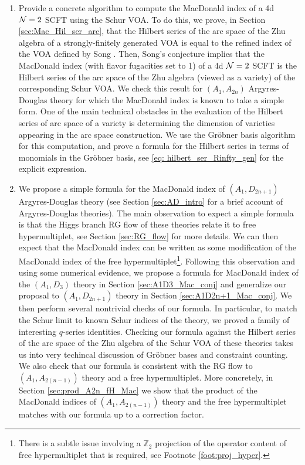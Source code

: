 \documentclass[a4paper,10pt]{article}
\newcommand{\Z}{\mathds{Z}}
\newcommand{\tsf}[1]{\textsf{#1}}
\def\CN {{\cal N}}
\begin{document}
\begin{enumerate}
    \item Provide a concrete algorithm to compute the MacDonald index of a 4d $\CN=2$ \tsf{SCFT} using the Schur \tsf{VOA}. To do this, we prove, in Section \ref{sec:Mac_Hil_ser_arc}, that the Hilbert series of the arc space of the Zhu algebra of a strongly-finitely generated \tsf{VOA} is equal to the refined index of the \tsf{VOA} defined by Song \cite{Song:2016yfd}. Then, Song's conjecture implies that the MacDonald index (with flavor fugacities set to 1) of a 4d $\CN=2$ \tsf{SCFT} is the Hilbert series of the arc space of the Zhu algebra (viewed as a variety) of the corresponding Schur \tsf{VOA}. We check this result for $(A_1,A_{2n})$ Argyres-Douglas theory for which the MacDonald index is known to take a simple form. One of the main technical obstacles in the evaluation of the Hilbert series of arc space of a variety is determining the dimension of varieties appearing in the arc space construction. We use the Gr\"{o}bner basis algorithm \cite{loustaunau1994introduction} for this computation, and prove a formula for the Hilbert series in terms of monomials in the Gr\"{o}bner basis, see \eqref{eq: hilbert_ser_Rinfty_gen} for the explicit expression.
    \item We propose a simple formula for the MacDonald index of $(A_1,D_{2n+1})$ Argyres-Douglas theory (see Section \ref{sec:AD_intro} for a brief account of Argyres-Douglas theories). The main observation to expect a simple formula is that the Higgs branch \tsf{RG} flow of these theories relate it to free hypermultiplet, see Section \ref{sec:RG_flow} for more details. We can then expect that the MacDonald index can be written as some modification of the MacDonald index of the free hypermultiplet\footnote{There is a subtle issue involving a $\Z_2$ projection of the operator content of free hypermultiplet that is required, see Footnote \ref{foot:proj_hyper}.}. Following this observation and using some numerical evidence, we propose a formula for MacDonald index of the $(A_1,D_3)$ theory in Section \ref{sec:A1D3_Mac_conj} and generalize our proposal to $(A_1,D_{2n+1})$ theory in Section \ref{sec:A1D2n+1_Mac_conj}.  We then perform several nontrivial checks of our formula. In particular, to match the Schur limit to known Schur indices of the theory, we proved a family of interesting $q$-series identities. Checking our formula against the Hilbert series of the arc space of the Zhu algebra of the Schur \tsf{VOA} of these theories takes us into very techincal discussion of Gr\"{o}bner bases and constraint counting. We also check that our formula is consistent with the \tsf{RG} flow to $(A_1,A_{2(n-1)})$ theory and a free hypermultiplet. More concretely, in Section \ref{sec:prod_A2n_fH_Mac} we show that the product of the MacDonald indices of $(A_1,A_{2(n-1)})$ theory and the free hypermultiplet matches with our formula up to a correction factor.  
    \end{enumerate} 
\end{document}
